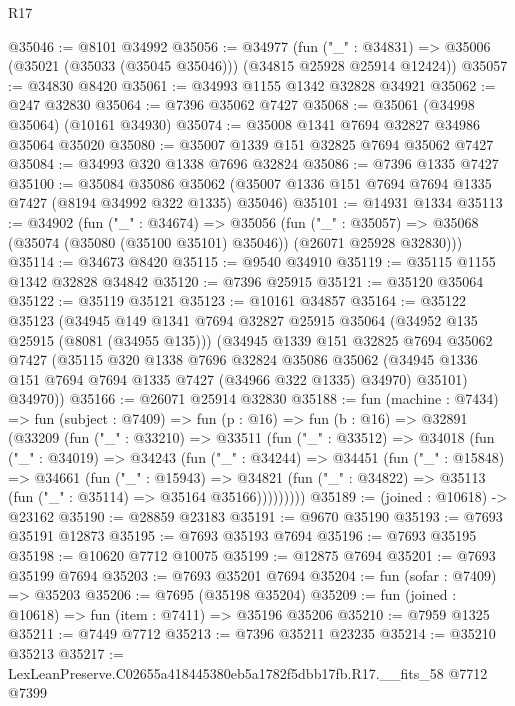 \begin{lexlean}{R17}
\begin{coremodule}
@35046 := @8101 @34992
@35056 := @34977
    (fun ("_" : @34831) => @35006 (@35021 (@35033 (@35045 @35046))) (@34815 @25928 @25914 @12424))
@35057 := @34830 @8420
@35061 := @34993 @1155 @1342 @32828 @34921
@35062 := @247 @32830
@35064 := @7396 @35062 @7427
@35068 := @35061 (@34998 @35064) (@10161 @34930)
@35074 := @35008 @1341 @7694 @32827 @34986 @35064 @35020
@35080 := @35007 @1339 @151 @32825 @7694 @35062 @7427
@35084 := @34993 @320 @1338 @7696 @32824
@35086 := @7396 @1335 @7427
@35100 := @35084
    @35086
    @35062
    (@35007 @1336 @151 @7694 @7694 @1335 @7427 (@8194 @34992 @322 @1335) @35046)
@35101 := @14931 @1334
@35113 := @34902
    (fun ("_" : @34674) =>
    @35056
      (fun ("_" : @35057) =>
      @35068 (@35074 (@35080 (@35100 @35101) @35046)) (@26071 @25928 @32830)))
@35114 := @34673 @8420
@35115 := @9540 @34910
@35119 := @35115 @1155 @1342 @32828 @34842
@35120 := @7396 @25915
@35121 := @35120 @35064
@35122 := @35119 @35121
@35123 := @10161 @34857
@35164 := @35122
    @35123
    (@34945
      @149
      @1341
      @7694
      @32827
      @25915
      @35064
      (@34952 @135 @25915 (@8081 (@34955 @135)))
      (@34945
        @1339
        @151
        @32825
        @7694
        @35062
        @7427
        (@35115
          @320
          @1338
          @7696
          @32824
          @35086
          @35062
          (@34945 @1336 @151 @7694 @7694 @1335 @7427 (@34966 @322 @1335) @34970)
          @35101)
        @34970))
@35166 := @26071 @25914 @32830
@35188 := fun (machine : @7434) =>
  fun (subject : @7409) =>
  fun (p : @16) =>
  fun (b : @16) =>
  @32891
    (@33209
      (fun ("_" : @33210) =>
      @33511
        (fun ("_" : @33512) =>
        @34018
          (fun ("_" : @34019) =>
          @34243
            (fun ("_" : @34244) =>
            @34451
              (fun ("_" : @15848) =>
              @34661
                (fun ("_" : @15943) =>
                @34821 (fun ("_" : @34822) => @35113 (fun ("_" : @35114) => @35164 @35166)))))))))
@35189 := (joined : @10618) -> @23162
@35190 := @28859 @23183
@35191 := @9670 @35190
@35193 := @7693 @35191 @12873
@35195 := @7693 @35193 @7694
@35196 := @7693 @35195
@35198 := @10620 @7712 @10075
@35199 := @12875 @7694
@35201 := @7693 @35199 @7694
@35203 := @7693 @35201 @7694
@35204 := fun (sofar : @7409) => @35203
@35206 := @7695 (@35198 @35204)
@35209 := fun (joined : @10618) => fun (item : @7411) => @35196 @35206
@35210 := @7959 @1325
@35211 := @7449 @7712
@35213 := @7396 @35211 @23235
@35214 := @35210 @35213
@35217 := LexLeanPreserve.C02655a418445380eb5a1782f5dbb17fb.R17.__fits_58 @7712 @7399

\end{coremodule}
\end{lexlean}
